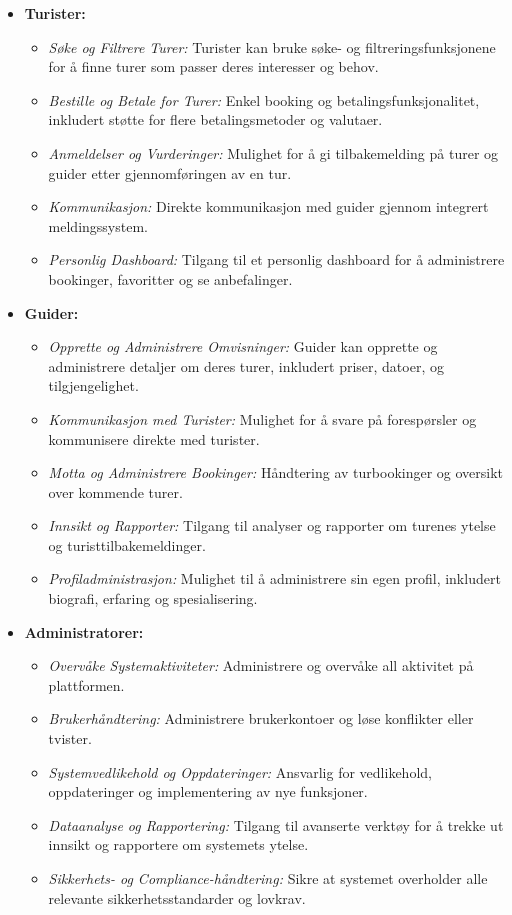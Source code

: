 \documentclass[../doc.tex]{subfiles}
\begin{document}
\begin{itemize}
    \item \textbf{Turister:}
    \begin{itemize}
        \item \textit{Søke og Filtrere Turer:} Turister kan bruke søke- og filtreringsfunksjonene for å finne turer som passer deres interesser og behov.
        \item \textit{Bestille og Betale for Turer:} Enkel booking og betalingsfunksjonalitet, inkludert støtte for flere betalingsmetoder og valutaer.
        \item \textit{Anmeldelser og Vurderinger:} Mulighet for å gi tilbakemelding på turer og guider etter gjennomføringen av en tur.
        \item \textit{Kommunikasjon:} Direkte kommunikasjon med guider gjennom integrert meldingssystem.
        \item \textit{Personlig Dashboard:} Tilgang til et personlig dashboard for å administrere bookinger, favoritter og se anbefalinger.
    \end{itemize}

    \item \textbf{Guider:}
    \begin{itemize}
        \item \textit{Opprette og Administrere Omvisninger:} Guider kan opprette og administrere detaljer om deres turer, inkludert priser, datoer, og tilgjengelighet.
        \item \textit{Kommunikasjon med Turister:} Mulighet for å svare på forespørsler og kommunisere direkte med turister.
        \item \textit{Motta og Administrere Bookinger:} Håndtering av turbookinger og oversikt over kommende turer.
        \item \textit{Innsikt og Rapporter:} Tilgang til analyser og rapporter om turenes ytelse og turisttilbakemeldinger.
        \item \textit{Profiladministrasjon:} Mulighet til å administrere sin egen profil, inkludert biografi, erfaring og spesialisering.
    \end{itemize}

    \item \textbf{Administratorer:}
    \begin{itemize}
        \item \textit{Overvåke Systemaktiviteter:} Administrere og overvåke all aktivitet på plattformen.
        \item \textit{Brukerhåndtering:} Administrere brukerkontoer og løse konflikter eller tvister.
        \item \textit{Systemvedlikehold og Oppdateringer:} Ansvarlig for vedlikehold, oppdateringer og implementering av nye funksjoner.
        \item \textit{Dataanalyse og Rapportering:} Tilgang til avanserte verktøy for å trekke ut innsikt og rapportere om systemets ytelse.
        \item \textit{Sikkerhets- og Compliance-håndtering:} Sikre at systemet overholder alle relevante sikkerhetsstandarder og lovkrav.
    \end{itemize}
\end{itemize}
\end{document}
